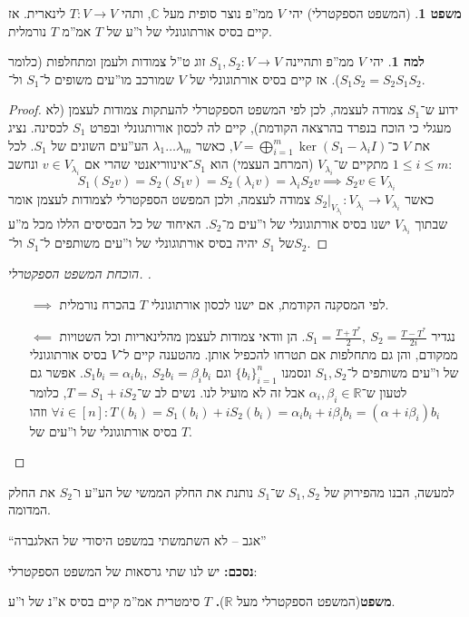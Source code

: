 \documentclass[a4paper]{article}
\newcommand\R     {\mathbb{R}}
\newcommand\C     {\mathbb{C}}
\newcommand\co        {\colon}
\newcommand\ag        {\alpha}
\newcommand\bg        {\beta}
\renewcommand\lg      {\lambda}
\theoremstyle{definition}
\newtheorem{Theorem}{\color{myblue}משפט}
\newtheorem{Lemma}{\color{myyellow}למה}
\newcommand\theo  [1] {\begin{Theorem}#1\end{Theorem}}
\newcommand\lem   [1] {\begin{Lemma}#1\end{Lemma}}
\begin{document}
	\theo{(המשפט הספקטרלי) יהי $V$ ממ''פ נוצר סופית מעל $\C$, ותהי $T \co V \to V$ לינארית. אז קיים בסיס אורתוגונלי של ו''ע של $T$ אמ''מ $T$ נורמלית. }
	\lem{יהי $V$ ממ''פ ותהיינה $S_1, S_2 \co V \to V$  זוג ט''ל צמודות ולעמן ומתחלפות (כלומר $S_1S_2 = S_2 S_1$). אז קיים בסיס אורתוגונלי של $V$ שמורכב מו''עים משופים ל־$S_1$ ול־$S_2$. }\begin{proof}
		ידוע ש־$S_1$ צמודה לעצמה, לכן לפי המשפט הספקטרלי להעתקות צמודות לעצמן (לא מעגלי כי הוכח בנפרד בהרצאה הקודמת), קיים לה לכסון אורותגונלי ובפרט $S_1$ לכסינה. נציג את $V$ כ־$V = \bigoplus_{i = 1}^{m} \ker(S_1 - \lg_iI)$, כאשר $\lg _1 \dots \lg_m$ הע''עים השונים של $S_1$. לכל $1 \le i \le m$  מתקיים ש־$V_{\lg_i}$ (המרחב העצמי) הוא $S_1$־אינווריאנטי שהרי אם $v \in V_{\lg_i}$ ונחשב: 
		\[ S_1(S_2 v) = S_2(S_1 v) = S_2(\lg_i v) = \lg _i S_2v \implies S_2 v \in V_{\lg_i} \]
		כאשר $S_2|_{V_{\lg _i}} \co V_{\lg_i} \to V_{\lg_i}$ צמודה לעצמה, ולכן המפשט הספקטרלי לצמודות לעצמן אומר שבתוך $V_{\lg_i}$ ישנו בסיס אורתוגונלי של ו''עים מ־$S_2$. האיחוד של כל הבסיסים הללו מכל מ''ע של $S_1$ יהיה בסיס אורתוגונלי של ו''עים משותפים ל־$S_1$ ול־$S_2$. 
	\end{proof}
	\begin{proof}[הוכחת המשפט הספקטרלי. ]\,
		\begin{itemize}
			\item[$\implies$] לפי המסקנה הקודמת, אם ישנו לכסון אורתוגונלי $T$ בהכרח נורמלית. 
			\item[$\impliedby$] נגדיר $S_1 = \frac{T + T^*}{2}, \ S_2 = \frac{T - T^*}{2i}$. הן וודאי צמודות לעצמן מהלינאריות וכל השטויות ממקודם, והן גם מתחלפות אם תטרחו להכפיל אותן. מהטענה קיים ל־$V$ בסיס אורתוגונלי של ו''עים משותפים ל־$S_1, S_2$ ונסמנו $\{b_i\}^{n}_{i = 1}$ וגם $S_1b_i = \ag_i b_i, \ S_2b_i= \bg_i b_i$. אפשר גם לטעון ש־$\ag_i, \bg_i \in \R$ אבל זה לא מועיל לנו. נשים לב ש־$T = S_1 + iS_2$, כלומר $\forall i \in [n] \co T(b_i) = S_1(b_i) + iS_2(b_i) = \ag_i b_i + i\bg_i b_i = (\ag + i\bg_i)b_i$ וזהו בסיס אורתוגונלי של ו''עים של $T$. 
		\end{itemize}
	\end{proof}
	
	למעשה, הבנו מהפירוק של $S_1, S_2$ ש־$S_1$ נותנת את החלק הממשי של הע''ע ו־$S_2$ את החלק המדומה. 
	
	``אגב – לא השתמשתי במשפט היסודי של האלגברה''
	
	\textbf{נסכם: }יש לנו שתי גרסאות של המשפט הספקטרלי: 
	
	\textbf{משפט}(המשפט הספקטרלי מעל $\R$)\textbf{. }{$T$ סימטרית אמ''מ קיים בסיס א''נ של ו''ע. }
	
\end{document}

